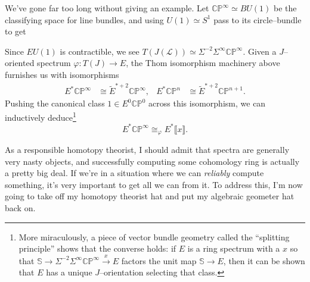 \documentclass{amsart}
\renewcommand{\S}{\mathbb S}
\newcommand{\C}{\mathbb{C}}
\newcommand{\CP}{\C\P}
\renewcommand{\P}{\mathbb{P}}
\newcommand{\<}{\langle}
\renewcommand{\>}{\rangle}
\newcommand{\Susp}{\Sigma}
\renewcommand{\phi}{\varphi}
\newcommand{\ps}[1]{\llbracket{#1}\rrbracket}
\theoremstyle{plain}
\theoremstyle{definition}
\theoremstyle{remark}
\begin{document}
We've gone far too long without giving an example.  Let $\CP^\infty \simeq BU(1)$ be the classifying space for line bundles, and using $U(1) \simeq S^1$ pass to its  circle--bundle to get
\begin{center}
\end{center}
Since $EU(1)$ is contractible, we see $T(J(\mathcal L)) \simeq \Susp^{-2} \Susp^\infty \CP^\infty$.  Given a $J$--oriented spectrum $\phi: T(J) \to E$, the Thom isomorphism machinery above furnishes us with isomorphisms
\begin{align*}
E^* \CP^\infty & \cong \tilde E^{*+2} \CP^\infty, &
E^* \CP^n & \cong \tilde E^{*+2} \CP^{n+1}.
\end{align*}
Pushing the canonical class $1 \in E^0 \CP^0$ across this isomorphism, we can inductively deduce\footnote{More miraculously, a piece of vector bundle geometry called the ``splitting principle'' shows that the converse holds: if $E$ is a ring spectrum with a $x$ so that $\S \to \Susp^{-2} \Susp^\infty \CP^\infty \xrightarrow{x} E$ factors the unit map $\S \to E$, then it can be shown that $E$ has a unique $J$--orientation selecting that class.} \[E^* \CP^\infty \cong_\phi E^*\ps{x}.\]

As a responsible homotopy theorist, I should admit that spectra are generally very nasty objects, and successfully computing some cohomology ring is actually a pretty big deal.  If we're in a situation where we can \emph{reliably} compute something, it's very important to get all we can from it.  To address this, I'm now going to take off my homotopy theorist hat and put my algebraic geometer hat back on.
\end{document}
